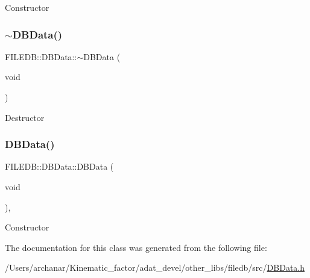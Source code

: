 Constructor \mbox{\label{classFILEDB_1_1DBData_afb154d074a887601e48853bb5b7089b5}} 
\subsubsection{\texorpdfstring{$\sim$DBData()}{~DBData()}\hspace{0.1cm}{\footnotesize\ttfamily [2/2]}}
{\footnotesize\ttfamily F\+I\+L\+E\+D\+B\+::\+D\+B\+Data\+::$\sim$\+D\+B\+Data (\begin{DoxyParamCaption}\item[{void}]{ }\end{DoxyParamCaption})\hspace{0.3cm}{\ttfamily [inline]}}

Destructor \mbox{\label{classFILEDB_1_1DBData_a81662e20dfe472b9c56ec1e9ff8278fc}} 
\subsubsection{\texorpdfstring{DBData()}{DBData()}\hspace{0.1cm}{\footnotesize\ttfamily [2/2]}}
{\footnotesize\ttfamily F\+I\+L\+E\+D\+B\+::\+D\+B\+Data\+::\+D\+B\+Data (\begin{DoxyParamCaption}\item[{void}]{ }\end{DoxyParamCaption})\hspace{0.3cm}{\ttfamily [inline]}, {\ttfamily [protected]}}

Constructor 

The documentation for this class was generated from the following file\+:\begin{DoxyCompactItemize}
\item 
/\+Users/archanar/\+Kinematic\+\_\+factor/adat\+\_\+devel/other\+\_\+libs/filedb/src/\mbox{\hyperlink{other__libs_2filedb_2src_2DBData_8h}{D\+B\+Data.\+h}}\end{DoxyCompactItemize}
